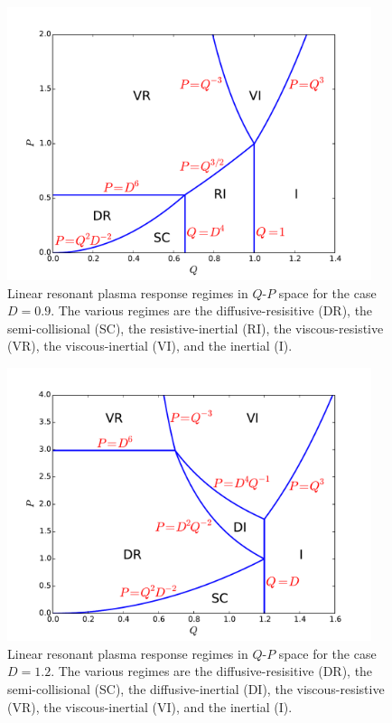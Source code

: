 \documentclass[12pt,prb,aps]{revtex4-1}
\begin{document}
\newpage 
\begin{figure}
\centerline{\includegraphics[width=0.95\textwidth]{Figure1.pdf}}
\caption{Linear resonant plasma response regimes in $Q$-$P$ space for the case $D=0.9$. The various regimes are
the diffusive-resisitive (DR), the semi-collisional (SC), the resistive-inertial (RI), the viscous-resistive (VR), the viscous-inertial
(VI), and the inertial (I).}\label{f1}
\end{figure}

\begin{figure}
\centerline{\includegraphics[width=0.95\textwidth]{Figure2.pdf}}
\caption{Linear resonant plasma response regimes in $Q$-$P$ space for the case $D=1.2$. The various regimes are
the diffusive-resisitive (DR), the semi-collisional (SC), the diffusive-inertial (DI), the viscous-resistive (VR), the viscous-inertial
(VI), and the inertial (I).}\label{f2}
\end{figure}
\end{document}

